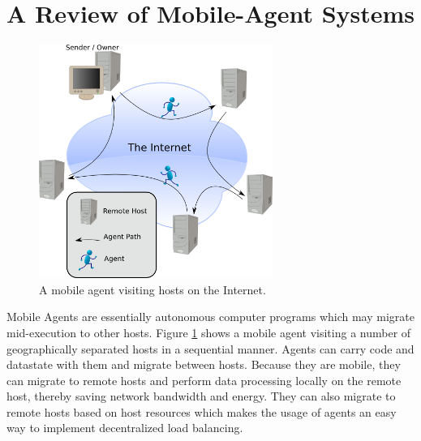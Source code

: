 
  \section{A Review of Mobile-Agent Systems} %
    \begin{figure}[!ht]
    \begin{center}
       \includegraphics[width=3in]{figures/internet_agencies}
    \end{center}
    \caption{\label{fig:internet_agencies}A mobile agent visiting hosts
    on the Internet.}
    \end{figure}

    Mobile Agents are essentially autonomous computer programs which may
    migrate mid-execution to other hosts. 
    Figure \ref{fig:internet_agencies} shows a mobile agent visiting a number
      of geographically separated hosts in a sequential manner. 
    Agents can carry code and datastate with them and migrate between hosts.
    Because they are mobile, they can migrate to remote hosts and perform
      data processing locally on the remote host, thereby saving network
      bandwidth and energy.
    They can also migrate to remote hosts based on host resources which
      makes the usage of agents an easy way to implement decentralized
      load balancing.

